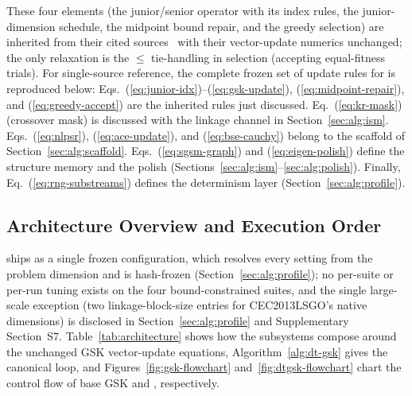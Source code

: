 These four elements (the junior/senior operator with its index
rules, the junior-dimension schedule, the midpoint bound repair, and
the greedy selection) are inherited from their cited
sources~\cite{mohamed2020gaining,tanabe2014improving} with their
vector-update numerics unchanged; the only relaxation is the $\le$
tie-handling in selection (accepting equal-fitness trials).
For single-source reference, the complete frozen set of update rules
for \dtgsk{} is reproduced below:
Eqs.~(\ref{eq:junior-idx})--(\ref{eq:gsk-update}),
(\ref{eq:midpoint-repair}), and (\ref{eq:greedy-accept}) are the
inherited rules just discussed.
Eq.~(\ref{eq:kr-mask}) (crossover mask) is discussed with the linkage
channel in Section~\ref{sec:alg:ism}.
Eqs.~(\ref{eq:nlpsr}), (\ref{eq:ace-update}), and
(\ref{eq:bse-cauchy}) belong to the scaffold of
Section~\ref{sec:alg:scaffold}.
Eqs.~(\ref{eq:sgsm-graph}) and (\ref{eq:eigen-polish}) define the
structure memory and the polish
(Sections~\ref{sec:alg:ism}--\ref{sec:alg:polish}). Finally,
Eq.~(\ref{eq:rng-substreams}) defines the determinism layer
(Section~\ref{sec:alg:profile}).



\subsection{Architecture Overview and Execution Order}\label{sec:alg:overview}

\dtgsk{} ships as a single frozen configuration,
which resolves every setting from the problem dimension and is
hash-frozen (Section~\ref{sec:alg:profile}); no per-suite or per-run
tuning exists on the four bound-constrained suites, and the single
large-scale exception (two linkage-block-size entries for
CEC2013LSGO's native dimensions) is disclosed in
Section~\ref{sec:alg:profile} and Supplementary Section~S7.
Table~\ref{tab:architecture} shows how the subsystems compose around
the unchanged GSK vector-update equations, Algorithm~\ref{alg:dt-gsk} gives the
canonical loop, and Figures~\ref{fig:gsk-flowchart}
and~\ref{fig:dtgsk-flowchart} chart the control flow of base GSK and
\dtgsk{}, respectively.

